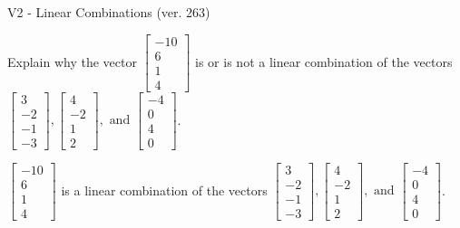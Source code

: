 \begin{exercise}
  \begin{exerciseTitle}V2 - Linear Combinations (ver. 263)\end{exerciseTitle}
  \begin{exerciseStatement}
    Explain why the vector \(\left[\begin{array}{c}
-10 \\
6 \\
1 \\
4
\end{array}\right]\)  is or is not a linear 
	combination of the vectors \(\left[\begin{array}{c}
3 \\
-2 \\
-1 \\
-3
\end{array}\right] , \left[\begin{array}{c}
4 \\
-2 \\
1 \\
2
\end{array}\right] , \text{ and } \left[\begin{array}{c}
-4 \\
0 \\
4 \\
0
\end{array}\right]\).
	


  \end{exerciseStatement}
  \begin{exerciseAnswer}
   \(\left[\begin{array}{c}
-10 \\
6 \\
1 \\
4
\end{array}\right]\) 
  	 is  
	a linear combination of the vectors \(\left[\begin{array}{c}
3 \\
-2 \\
-1 \\
-3
\end{array}\right] , \left[\begin{array}{c}
4 \\
-2 \\
1 \\
2
\end{array}\right] , \text{ and } \left[\begin{array}{c}
-4 \\
0 \\
4 \\
0
\end{array}\right]\).

	
  


  \end{exerciseAnswer}
\end{exercise}